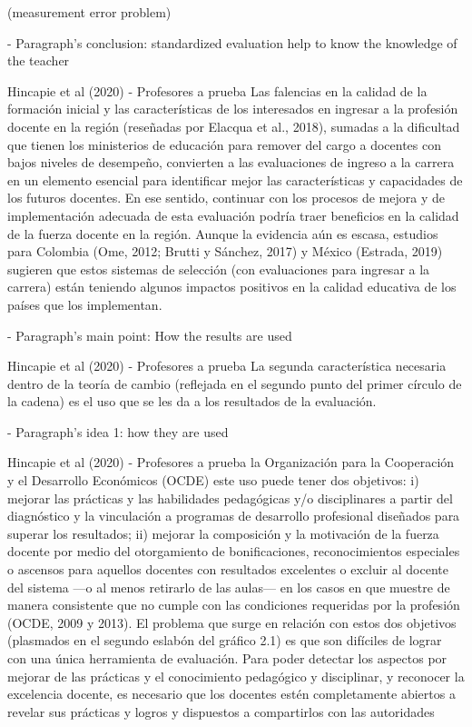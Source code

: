  (measurement error problem)

- Paragraph's conclusion: standardized evaluation help to know the knowledge of the teacher

Hincapie et al (2020) - Profesores a prueba
Las falencias en la calidad de la formación inicial y las características de los interesados
en ingresar a la profesión docente en la región (reseñadas por Elacqua et al., 2018), sumadas a la dificultad que tienen los ministerios de educación para remover del cargo a docentes con bajos niveles de desempeño, convierten a las evaluaciones de ingreso a la carrera en un elemento esencial para identificar mejor las características y capacidades de los futuros docentes. En ese sentido, continuar con los procesos de mejora y de implementación adecuada de esta evaluación podría traer beneficios en la calidad de la fuerza docente en la región. Aunque la evidencia aún es escasa, estudios para Colombia (Ome, 2012; Brutti y Sánchez, 2017) y México (Estrada, 2019) sugieren que estos sistemas de selección (con evaluaciones para ingresar a la carrera) están teniendo algunos impactos positivos en la calidad educativa de los países que los implementan.



- Paragraph's main point: How the results are used

Hincapie et al (2020) - Profesores a prueba
La segunda característica necesaria dentro de la teoría de cambio (reflejada en el segundo punto del primer círculo de la cadena) es el uso que se les da a los resultados de la evaluación.

- Paragraph's idea 1: how they are used

Hincapie et al (2020) - Profesores a prueba
la Organización para la Cooperación y el Desarrollo Económicos (OCDE) este uso puede tener dos objetivos: i) mejorar las prácticas y las habilidades pedagógicas y/o disciplinares a partir del diagnóstico y la vinculación a programas de desarrollo profesional diseñados para superar los resultados; ii) mejorar la composición y la motivación de la fuerza docente por medio del otorgamiento de bonificaciones, reconocimientos especiales o ascensos para aquellos docentes con resultados excelentes o excluir al docente del sistema —o al menos retirarlo de las aulas— en los casos en que muestre de manera consistente que no cumple con las condiciones requeridas por la profesión (OCDE, 2009 y 2013).
El problema que surge en relación con estos dos objetivos (plasmados en el segundo eslabón del gráfico 2.1) es que son difíciles de lograr con una única herramienta de evaluación.
Para poder detectar los aspectos por mejorar de las prácticas y el conocimiento pedagógico y disciplinar, y reconocer la excelencia docente, es necesario que los docentes estén completamente abiertos a revelar sus prácticas y logros y dispuestos a compartirlos con las autoridades


